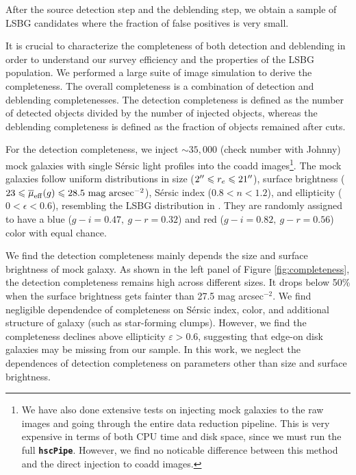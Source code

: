 \documentclass[twocolumn,astrosymb,twocolappendix]{aastex631}
\newcommand{\code}[1]{\textbf{\texttt{#1}}}
\newcommand{\sersic}{S\'ersic}
\begin{document}
\begin{CJK*}{UTF8}{gbsn}
After the source detection step and the deblending step, we obtain a sample of LSBG candidates where the fraction of false positives is very small. 

It is crucial to characterize the completeness of both detection and deblending in order to understand our survey efficiency and the properties of the LSBG population. We performed a large suite of image simulation to derive the completeness. The overall completeness is a combination of detection and deblending completenesses. The detection completeness is defined as the number of detected objects divided by the number of injected objects, whereas the deblending completeness is defined as the fraction of objects remained after cuts. 

For the detection completeness, we inject $\sim 35,000$ (check number with Johnny) mock galaxies with single \sersic{} light profiles \citep{Sersic1963} into the coadd images\footnote{We have also done extensive tests on injecting mock galaxies to the raw images and going through the entire data reduction pipeline. This is very expensive in terms of both CPU time and disk space, since we must run the full \code{hscPipe}. However, we find no noticable difference between this method and the direct injection to coadd images.}. The mock galaxies follow uniform distributions in size ($2\mbox{$^{\prime\prime}$} \leqslant r_{e} \leqslant 21\mbox{$^{\prime\prime}$}$), surface brightness ($23 \leqslant \overline{\mu}_{\rm eff}(g) \leqslant 28.5\ \mathrm{mag\ arcsec^{-2}}$), \sersic{} index ($0.8 < n < 1.2$), and ellipticity ($0 < \epsilon < 0.6$), resembling the LSBG distribution in . They are randomly assigned to have a blue ($g-i=0.47,\ g-r=0.32$) and red ($g-i=0.82,\ g-r=0.56$) color with equal chance.

We find the detection completeness mainly depends the size and surface brightness of mock galaxy. As shown in the left panel of Figure \ref{fig:completeness}, the detection completeness remains high across different sizes. It drops below 50\% when the surface brightness gets fainter than 27.5 mag arcsec$^{-2}$. We find negligible dependendce of completeness on \sersic{} index, color, and additional structure of galaxy (such as star-forming clumps). However, we find the completeness declines above ellipticity $\varepsilon > 0.6$, suggesting that edge-on disk galaxies may be missing from our sample. In this work, we neglect the dependences of detection completeness on parameters other than size and surface brightness. 


\end{CJK*}
\end{document}
